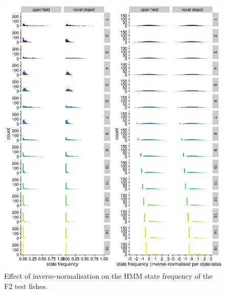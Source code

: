 \documentclass[
]{article}
\begin{document}
\begin{figure}
\includegraphics[width=1\linewidth]{figs/mikk_behaviour/0.08_15_state_freq_F2_dge} \caption{Effect of inverse-normalisation on the HMM state frequency of the F2 test fishes.}\label{fig:F2-state-freq-dge}
\end{figure}
\end{document}
